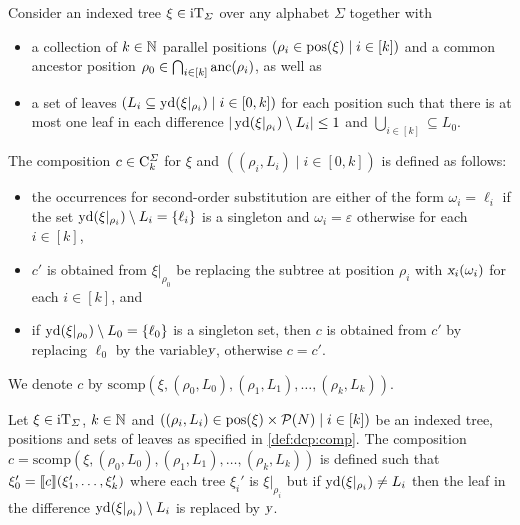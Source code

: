 \documentclass[../../document.tex]{subfiles}
\begin{document}
    \begin{definition}\label{def:dcp:comp}
        Consider an indexed tree \(\xi \in \operatorname{iT}_{\varSigma}\) over any alphabet \(\varSigma\) together with
        \begin{itemize}
            \item
                a collection of \(k \in \mathbb{N}\) parallel positions \((\rho_i \in \operatorname{pos}(\xi) \mid i \in [k])\) and
                a common ancestor position \(\rho_0 \in \bigcap_{i \in [k]} \operatorname{anc}(\rho_i)\), as well as
            \item
                a set of leaves \((L_i \subseteq \operatorname{yd}(\xi|_{\rho_i}) \mid i \in [0, k])\) for each position such that
                there is at most one leaf in each difference \( | \operatorname{yd}(\xi|_{\rho_i}) \setminus L_i | \leq 1 \) and \(\bigcup_{i \in [k]} \subseteq  L_0\).
        \end{itemize}
        The  composition \(c \in \mathrm{C}^\varSigma_k\) for \(\xi\) and \(((\rho_i, L_i) \mid i \in [0,k])\) is defined as follows:
        \begin{itemize}
            \item
                the occurrences for second-order substitution are either of the form \(\omega_i = \ell_i\) if the set \(\operatorname{yd}(\xi|_{\rho_i}) \setminus L_i = \{\ell_i\}\) is a singleton and \(\omega_i = \varepsilon\) otherwise for each \(i \in [k]\),
            \item
                \(c'\) is obtained from \(\xi|_{\rho_0}\) be replacing the subtree at position
                \(\rho_i\) with \(\textsl{x}_i(\omega_i)\) for each \(i \in [k]\), and
            \item
                if \(\operatorname{yd}(\xi|_{\rho_0}) \setminus L_0 = \{\ell_0\}\) is a singleton set,
                then \(c\) is obtained from \(c'\) by replacing \(\ell_0\) by the variable\(\textsl{y}\), otherwise \(c = c'\).
        \end{itemize}
        We denote \(c\) by \(\mathrm{scomp}(\xi, (\rho_0, L_0), (\rho_1, L_1), \ldots, (\rho_k, L_k))\).
    \end{definition}

    \begin{lemma}
        Let \(\xi \in \operatorname{iT}_{\varSigma}\), \(k \in \mathbb{N}\) and \(((\rho_i, L_i) \in \operatorname{pos}(\xi) \times \mathcal{P}(N) \mid i \in [k])\) be an indexed tree, positions and sets of leaves as specified in \cref{def:dcp:comp}.
        The composition \(c = \mathrm{scomp}(\xi, (\rho_0, L_0), (\rho_1, L_1), \ldots, (\rho_k, L_k))\) is defined such that \(\xi_0' = \llbracket c\rrbracket(\xi_1', \ldots, \xi_k')\) where each tree \(\xi_i'\) is \(\xi|_{\rho_i}\) but if \(\operatorname{yd}(\xi|_{\rho_i}) \neq L_i\) then the leaf in the difference \(\operatorname{yd}(\xi|_{\rho_i}) \setminus L_i\) is replaced by \(\textsl{y}\).
    \end{lemma}
\end{document}

